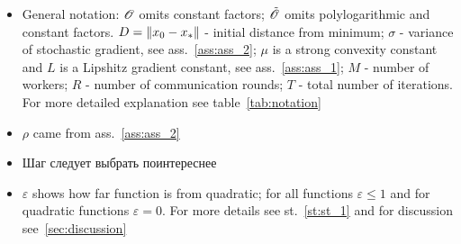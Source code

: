 \begin{table}[H]
\begin{adjustwidth}{-5cm}{-5cm}
\begin{threeparttable}
\begin{tabular}{|p{2cm}|p{1.7cm}|p{1.7cm}|p{1.5cm}|p{1.5cm}|p{8cm}|}
\hline

\end{tabular}
\begin{tablenotes}
\begin{itemize}
    \item General notation: 
    $\mathcal{O}$ omits constant factors;
    $\tilde{\mathcal{O}}$ omits polylogarithmic and constant factors.
    $D = \left\|x_0-x_*\right\|$ - initial distance from minimum;
    $\sigma$ - variance of stochastic gradient, see ass.~\ref{ass:ass_2}; 
    $\mu$ is a strong convexity constant 
    and $L$ is a Lipshitz gradient constant, see ass.~\ref{ass:ass_1};
    $M$ - number of workers;
    $R$ - number of communication rounds;
    $T$ - total number of iterations. For more detailed explanation see table~\ref{tab:notation}
    
    \item {} $\rho$ came from ass.~\ref{ass:ass_2}

    \item {} Шаг следует выбрать поинтереснее
    
    \item {} $\varepsilon$ shows how far function is from quadratic; 
    for all functions $\varepsilon \leq 1$ and for quadratic functions $\varepsilon = 0$. For more details see st.~\ref{st:st_1} and for discussion see~\ref{sec:discussion}
\end{itemize}
\end{tablenotes}
\end{threeparttable}

\end{adjustwidth} %

\label{tab:different_row_counts}

\end{table}
